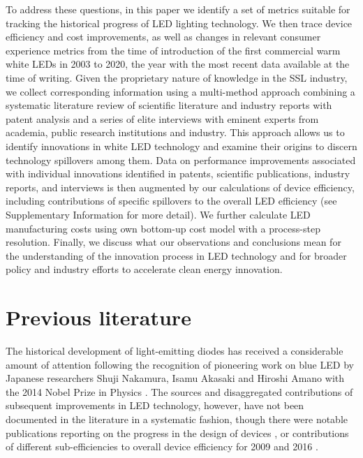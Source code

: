 \documentclass[twoside,twocolumn,9pt]{article}
\begin{document}
To address these questions, in this paper we identify a set of metrics suitable for tracking the historical progress of LED lighting technology. We then trace device efficiency and cost improvements, as well as changes in relevant consumer experience metrics from the time of introduction of the first commercial warm white LEDs in 2003 to 2020, the year with the most recent data available at the time of writing. Given the proprietary nature of knowledge in the SSL industry, we collect corresponding information using a multi-method approach combining a systematic literature review of scientific literature and industry reports with patent analysis and a series of elite interviews \cite{tansey2009process} with eminent experts from academia, public research institutions and industry. This approach allows us to identify innovations in white LED technology and examine their origins to discern technology spillovers among them. Data on performance improvements associated with individual innovations identified in patents, scientific publications, industry reports, and interviews is then augmented by our calculations of device efficiency, including contributions of specific spillovers to the overall LED efficiency (see Supplementary Information for more detail). We further calculate LED manufacturing costs using own bottom-up cost model with a process-step resolution. Finally, we discuss what our observations and conclusions mean for the understanding of the innovation process in LED technology and for broader policy and industry efforts to accelerate clean energy innovation.

\section{Previous literature}

The historical development of light-emitting diodes has received a considerable amount of attention following the recognition of pioneering work on blue LED by Japanese researchers Shuji Nakamura, Isamu Akasaki and Hiroshi Amano with the 2014 Nobel Prize in Physics \cite{Akasaki2015} \cite{Nakamura2015}. The sources and disaggregated contributions of subsequent improvements in LED technology, however, have not been documented in the literature in a systematic fashion, though there were notable publications reporting on the progress in the design of devices \cite{Shchekin2006} \cite{krames2007led} \cite{laubsch2009high} \cite{hahn2014development}, or contributions of different sub-efficiencies to overall device efficiency for 2009 \cite{tsao2010solid} and 2016 \cite{pattison2017solid}. 
\end{document}
